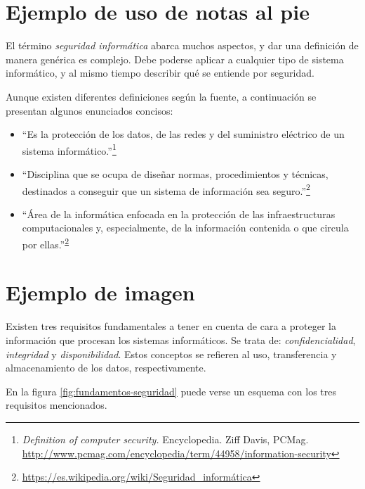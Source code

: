 \documentclass[12pt,a4paper,onecolumn,oneside]{report}
\begin{document}
\section*{Ejemplo de uso de notas al pie}
\label{Seguridad general}

El término \emph{seguridad informática} abarca muchos aspectos, y dar una definición de manera genérica es complejo. Debe poderse aplicar a cualquier tipo de sistema informático, y al mismo tiempo describir qué se entiende por seguridad.

Aunque existen diferentes definiciones según la fuente, a continuación se presentan algunos enunciados concisos:

\begin{itemize}

\item ``Es la protección de los datos, de las redes y del suministro eléctrico de un sistema informático.''\footnote{\textit{Definition of computer security.} Encyclopedia. Ziff Davis, PCMag. \url{http://www.pcmag.com/encyclopedia/term/44958/information-security}}

\item ``Disciplina que se ocupa de diseñar normas, procedimientos y técnicas, destinados a conseguir que un sistema de información sea seguro.''\footnote{\url{https://es.wikipedia.org/wiki/Seguridad_informática}\label{segWiki}}

\item ``Área de la informática enfocada en la protección de las infraestructuras computacionales y, especialmente, de la información contenida o que circula por ellas.''\textsuperscript{\ref{segWiki}}

\end{itemize}
 

\section*{Ejemplo de imagen}

Existen tres requisitos fundamentales a tener en cuenta de cara a proteger la información que procesan los sistemas informáticos.
Se trata de: \textit{confidencialidad}, \textit{integridad} y \textit{disponibilidad}. Estos conceptos se refieren al uso, transferencia y almacenamiento de los datos, respectivamente.

En la figura \ref{fig:fundamentos-seguridad} puede verse un esquema con los tres requisitos mencionados.
\end{document}
